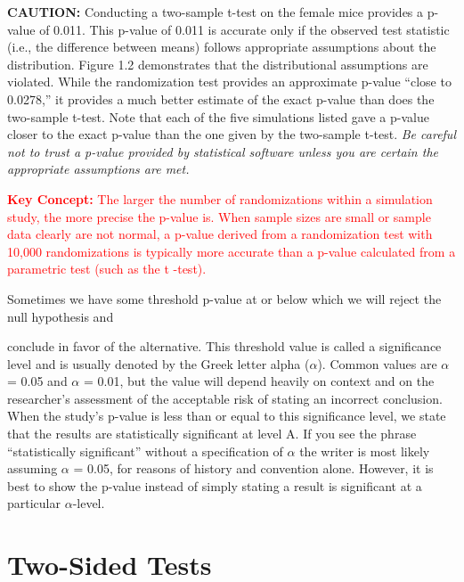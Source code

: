 \documentclass[
]{report}
\begin{document}
\textbf{CAUTION:}
Conducting a two-sample t-test on the female mice provides a p-value of 0.011. This p-value of 0.011 is
accurate only if the observed test statistic (i.e., the difference between means) follows appropriate assumptions
about the distribution. Figure 1.2 demonstrates that the distributional assumptions are violated. While
the randomization test provides an approximate p-value ``close to 0.0278,'' it provides a much better estimate
of the exact p-value than does the two-sample t-test. Note that each of the five simulations listed gave a
p-value closer to the exact p-value than the one given by the two-sample t-test. \textit{Be careful not to trust a
p-value provided by statistical software unless you are certain the appropriate assumptions are met.}

\Large

\textbf{\textcolor{red}{Key Concept:}}
\textcolor{red}{The larger the number of randomizations within a simulation study, the more precise the p-value is.
When sample sizes are small or sample data clearly are not normal, a p-value derived from a randomization
test with 10,000 randomizations is typically more accurate than a p-value calculated from
a parametric test (such as the t -test).}

\normalsize

Sometimes we have some threshold p-value at or below which we will reject the null hypothesis and

conclude in favor of the alternative. This threshold value is called a significance level and is usually denoted
by the Greek letter alpha (\(\alpha\)). Common values are \(\alpha\) = 0.05 and \(\alpha\) = 0.01, but the value will depend heavily
on context and on the researcher's assessment of the acceptable risk of stating an incorrect conclusion. When
the study's p-value is less than or equal to this significance level, we state that the results are statistically
significant at level A. If you see the phrase ``statistically significant'' without a specification of \(\alpha\) the writer
is most likely assuming \(\alpha\) = 0.05, for reasons of history and convention alone. However, it is best to show
the p-value instead of simply stating a result is significant at a particular \(\alpha\)-level.

\section{\texorpdfstring{\textbf{Two-Sided Tests}}{Two-Sided Tests}}\label{two-sided-tests}
\end{document}

